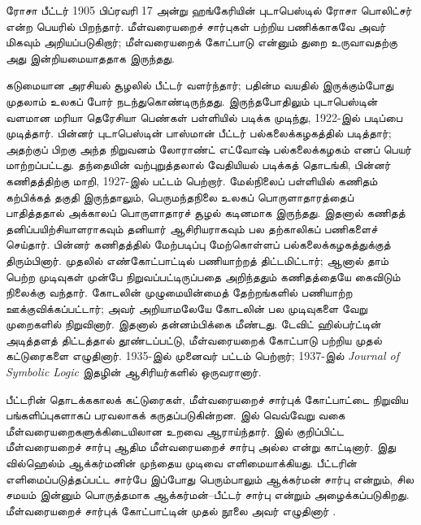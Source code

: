\documentclass[../../../include/open-logic-section]{subfiles}
\begin{document}



ரோசா பீட்டர் 1905 பிப்ரவரி 17 அன்று ஹங்கேரியின் புடாபெஸ்டில் ரோசா
பொலிட்சர் என்ற பெயரில் பிறந்தார். மீள்வரையறைச் சார்புகள் பற்றிய
பணிக்காகவே அவர் மிகவும் அறியப்படுகிறார்; மீள்வரையறைக் கோட்பாடு என்னும்
துறை உருவாவதற்கு அது இன்றியமையாததாக இருந்தது.

கடுமையான அரசியல் சூழலில் பீட்டர் வளர்ந்தார்; பதின்ம வயதில் இருக்கும்போது
முதலாம் உலகப் போர் நடந்துகொண்டிருந்தது. இருந்தபோதிலும் புடாபெஸ்டின்
வளமான மரியா தெரேசியா பெண்கள் பள்ளியில் படிக்க முடிந்து, 1922-இல்
படிப்பை முடித்தார். பின்னர் புடாபெஸ்டின் பாஸ்மான் பீட்டர்
பல்கலைக்கழகத்தில் படித்தார்; அதற்குப் பிறகு அந்த நிறுவனம் லோராண்ட்
எட்வோஷ் பல்கலைக்கழகம் எனப் பெயர் மாற்றப்பட்டது. தந்தையின் வற்புறுத்தலால்
வேதியியல் படிக்கத் தொடங்கி, பின்னர் கணிதத்திற்கு மாறி, 1927-இல்
பட்டம் பெற்றார். மேல்நிலைப் பள்ளியில் கணிதம் கற்பிக்கத் தகுதி இருந்தாலும்,
பெருமந்தநிலை உலகப் பொருளாதாரத்தைப் பாதித்ததால் அக்காலப் பொருளாதாரச்
சூழல் கடினமாக இருந்தது. இதனால் கணிதத் தனிப்பயிற்சியாளராகவும் தனியார்
ஆசிரியராகவும் பல தற்காலிகப் பணிகளைச் செய்தார். பின்னர் கணிதத்தில்
மேற்படிப்பு மேற்கொள்ளப் பல்கலைக்கழகத்துக்குத் திரும்பினார். முதலில்
எண்கோட்பாட்டில் பணியாற்றத் திட்டமிட்டார்; ஆனால் தாம் பெற்ற முடிவுகள்
முன்பே நிறுவப்பட்டிருப்பதை அறிந்ததும் கணிதத்தையே கைவிடும் நிலைக்கு
வந்தார். கோடலின் முழுமையின்மைத் தேற்றங்களில் பணியாற்ற ஊக்குவிக்கப்பட்டார்;
அவர் அறியாமலேயே கோடலின் பல முடிவுகளை வேறு முறைகளில் நிறுவினார். இதனால்
தன்னம்பிக்கை மீண்டது. டேவிட் ஹில்பர்ட்டின் அடித்தளத் திட்டத்தால்
தூண்டப்பட்டு, மீள்வரையறைக் கோட்பாடு பற்றிய முதல் கட்டுரைகளை எழுதினார்.
1935-இல் முனைவர் பட்டம் பெற்றார்; 1937-இல் \emph{Journal of
  Symbolic Logic} இதழின் ஆசிரியர்களில் ஒருவரானார்.

பீட்டரின் தொடக்ககாலக் கட்டுரைகள், மீள்வரையறைச் சார்புக் கோட்பாட்டை
நிறுவிய பங்களிப்புகளாகப் பரவலாகக் கருதப்படுகின்றன. \cite{Peter1935a}
இல் வெவ்வேறு வகை மீள்வரையறைகளுக்கிடையிலான உறவை ஆராய்ந்தார்.
\cite{Peter1935b} இல் குறிப்பிட்ட மீள்வரையறைச் சார்பு ஆதிம
மீள்வரையறைச் சார்பு அல்ல என்று காட்டினார். இது வில்ஹெல்ம் ஆக்கர்மனின்
முந்தைய முடிவை எளிமையாக்கியது. பீட்டரின் எளிமைப்படுத்தப்பட்ட சார்பே
இப்போது பெரும்பாலும் ஆக்கர்மன் சார்பு என்றும், சில சமயம் இன்னும்
பொருத்தமாக ஆக்கர்மன்--பீட்டர் சார்பு என்றும் அழைக்கப்படுகிறது.
மீள்வரையறைச் சார்புக் கோட்பாட்டின் முதல் நூலை அவர் எழுதினார்
\citep{Peter1951}.
\end{document}
